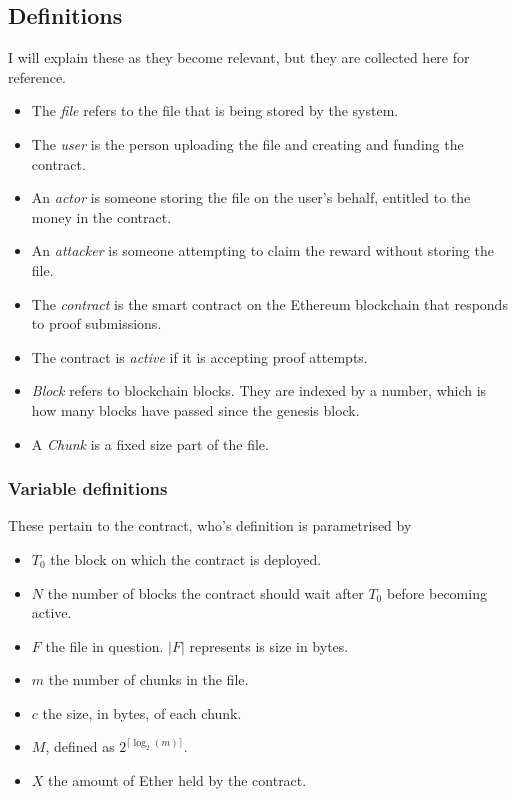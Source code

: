 \documentclass[10pt,twoside,a4paper]{article}
\begin{document}
\subsection{Definitions}

I will explain these as they become relevant, but they are collected here for reference.

\begin{itemize}
\item The \textit{file} refers to the file that is being stored by the system.

\item The \textit{user} is the person uploading the file and creating and funding the contract.

\item An \textit{actor} is someone storing the file on the user's behalf, entitled to the money in the contract.

\item An \textit{attacker} is someone attempting to claim the reward without storing the file.

\item The \textit{contract} is the smart contract on the Ethereum blockchain that responds to proof submissions.

\item  The contract is \textit{active} if it is accepting proof attempts.

\item \textit{Block} refers to blockchain blocks. They are indexed by a number, which is how many blocks have passed since the genesis block.

\item A \textit{Chunk} is a fixed size part of the file.
\end{itemize}

\subsubsection{Variable definitions}

These pertain to the contract, who's definition is parametrised by

\begin{itemize}
\item $T_0$ the block on which the contract is deployed.
\item $N$ the number of blocks the contract should wait after $T_0$ before becoming active.
\item $F$ the file in question. $|F|$ represents is size in bytes.
\item $m$ the number of chunks in the file.
\item $c$ the size, in bytes, of each chunk.
\item $M$, defined as $2^{\lceil \log_2(m) \rceil}$.
\item $X$ the amount of Ether held by the contract.
\end{itemize}
\end{document}
